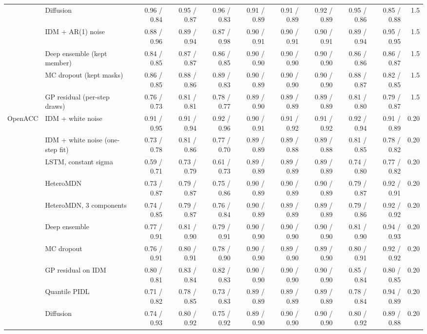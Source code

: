 \begin{longtable}{llrrrrrrrrr}
 & Diffusion & 0.96 / 0.84 & 0.95 / 0.87 & 0.96 / 0.83 & 0.91 / 0.89 & 0.91 / 0.89 & 0.92 / 0.89 & 0.95 / 0.86 & 0.85 / 0.88 & 1.5 \\
 & IDM + AR(1) noise & 0.88 / 0.96 & 0.89 / 0.94 & 0.87 / 0.98 & 0.90 / 0.91 & 0.90 / 0.91 & 0.90 / 0.91 & 0.89 / 0.94 & 0.95 / 0.95 & 1.5 \\
 & Deep ensemble (kept member) & 0.84 / 0.85 & 0.87 / 0.87 & 0.86 / 0.85 & 0.90 / 0.90 & 0.90 / 0.90 & 0.90 / 0.90 & 0.86 / 0.86 & 0.86 / 0.87 & 1.5 \\
 & MC dropout (kept masks) & 0.86 / 0.85 & 0.88 / 0.86 & 0.89 / 0.83 & 0.90 / 0.89 & 0.90 / 0.90 & 0.90 / 0.90 & 0.88 / 0.87 & 0.82 / 0.85 & 1.5 \\
 & GP residual (per-step draws) & 0.76 / 0.73 & 0.81 / 0.81 & 0.78 / 0.77 & 0.89 / 0.90 & 0.89 / 0.89 & 0.89 / 0.89 & 0.81 / 0.80 & 0.79 / 0.87 & 1.5 \\
\midrule
OpenACC & IDM + white noise & 0.91 / 0.95 & 0.91 / 0.94 & 0.92 / 0.96 & 0.90 / 0.91 & 0.91 / 0.92 & 0.91 / 0.92 & 0.92 / 0.94 & 0.91 / 0.89 & 0.20 \\
 & IDM + white noise (one-step fit) & 0.73 / 0.78 & 0.81 / 0.86 & 0.77 / 0.70 & 0.89 / 0.89 & 0.89 / 0.88 & 0.89 / 0.88 & 0.81 / 0.85 & 0.78 / 0.82 & 0.20 \\
 & LSTM, constant sigma & 0.59 / 0.71 & 0.73 / 0.79 & 0.61 / 0.73 & 0.89 / 0.89 & 0.89 / 0.89 & 0.89 / 0.89 & 0.74 / 0.80 & 0.77 / 0.82 & 0.20 \\
 & HeteroMDN & 0.73 / 0.87 & 0.79 / 0.87 & 0.75 / 0.86 & 0.90 / 0.89 & 0.90 / 0.89 & 0.90 / 0.89 & 0.79 / 0.87 & 0.92 / 0.91 & 0.20 \\
 & HeteroMDN, 3 components & 0.74 / 0.85 & 0.79 / 0.87 & 0.76 / 0.84 & 0.90 / 0.89 & 0.89 / 0.89 & 0.89 / 0.89 & 0.79 / 0.86 & 0.92 / 0.92 & 0.20 \\
 & Deep ensemble & 0.77 / 0.91 & 0.81 / 0.90 & 0.79 / 0.91 & 0.90 / 0.90 & 0.90 / 0.90 & 0.90 / 0.90 & 0.81 / 0.90 & 0.94 / 0.93 & 0.20 \\
 & MC dropout & 0.76 / 0.91 & 0.80 / 0.91 & 0.78 / 0.90 & 0.90 / 0.90 & 0.89 / 0.90 & 0.89 / 0.90 & 0.80 / 0.91 & 0.92 / 0.92 & 0.20 \\
 & GP residual on IDM & 0.80 / 0.81 & 0.83 / 0.84 & 0.82 / 0.83 & 0.90 / 0.90 & 0.90 / 0.90 & 0.90 / 0.90 & 0.85 / 0.84 & 0.80 / 0.85 & 0.20 \\
 & Quantile PIDL & 0.71 / 0.82 & 0.78 / 0.85 & 0.73 / 0.83 & 0.89 / 0.89 & 0.89 / 0.89 & 0.89 / 0.89 & 0.78 / 0.84 & 0.94 / 0.89 & 0.20 \\
 & Diffusion & 0.74 / 0.93 & 0.80 / 0.92 & 0.75 / 0.92 & 0.89 / 0.90 & 0.90 / 0.90 & 0.90 / 0.90 & 0.80 / 0.92 & 0.89 / 0.88 & 0.20 \\

\end{longtable}
